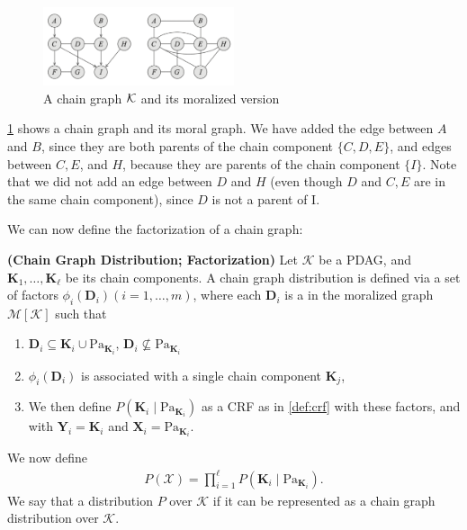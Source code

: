 \documentclass{article}
\newcommand{\bfs}[1]{\textbf{({#1}) }}
\begin{document}
\begin{exma}
\begin{figure}[H]
    \centering
    \includegraphics[width=0.5\textwidth]{Figs/a25.png}
    \caption{A chain graph $\mathcal{K}$ and its moralized version}
    \label{fig:avfbf}
\end{figure}
\cref{fig:avfbf} shows a chain graph and its moral graph. We have added the edge between $A$ and $B$, since they are both parents of the chain component $\{C, D, E\}$, and edges between $C, E$, and $H$, because they are parents of the chain component $\{I\}$. Note that we did not add an edge between $D$ and $H$ (even though $D$ and $C, E$ are in the same chain component), since $D$ is not a parent of I.
\end{exma}


We can now define the factorization of a chain graph:
\begin{defa}\bfs{Chain Graph Distribution; Factorization}
Let $\mathcal{K}$ be a PDAG, and $\boldsymbol{K}_{1}, \ldots, \boldsymbol{K}_{\ell}$ be its chain components. A chain graph distribution is defined via a set of factors $\phi_{i}\left(\boldsymbol{D}_{i}\right)(i=1, \ldots, m)$, where each $\boldsymbol{D}_{i}$ is a  in the moralized graph $\mathcal{M}\left[\mathcal{K}\right]$  such that 
\begin{enumerate}
    \item $\boldsymbol{D}_{i} \subseteq \boldsymbol{K}_{i} \cup \mathrm{Pa}_{\boldsymbol{K}_{i}}$, $\boldsymbol{D}_{i} \not \subseteq \mathrm{Pa}_{\boldsymbol{K}_{i}}$
    \item $\phi_{i}\left(\boldsymbol{D}_{i}\right)$ is associated with a single chain component $\boldsymbol{K}_{j}$,
    \item We then define $P\left(\boldsymbol{K}_{i} \mid \mathrm{Pa}_{\boldsymbol{K}_{i}}\right)$ as a CRF as in \cref{def:crf} with these factors, and with $\boldsymbol{Y}_{i}=\boldsymbol{K}_{i}$ and $\boldsymbol{X}_{i}=\mathrm{Pa}_{\boldsymbol{K}_{i}}$. 
\end{enumerate}   We now define
\begin{align*}
P(\mathcal{X})=\prod_{i=1}^{\ell} P\left(\boldsymbol{K}_{i} \mid \mathrm{Pa}_{\boldsymbol{K}_{i}}\right) .
\end{align*}
We say that a distribution $P$  over $\mathcal{K}$ if it can be represented as a chain graph distribution over $\mathcal{K}$.
\end{defa}
\end{document}
